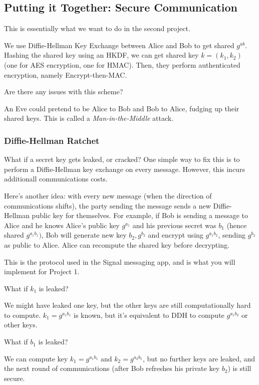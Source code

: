 \subsection{Putting it Together: Secure Communication}
This is essentially what we want to do in the second project.

We use Diffie-Hellman Key Exchange between Alice and Bob to get shared $g^{ab}$. Hashing the shared key using an HKDF, we can get shared key $k = (k_1, k_2)$ (one for AES encryption, one for HMAC). Then, they perform authenticated encryption, namely Encrypt-then-MAC.

\begin{ques*}
    Are there any issues with this scheme?
\end{ques*}
An Eve could pretend to be Alice to Bob and Bob to Alice, fudging up their shared keys. This is called a \emph{Man-in-the-Middle} attack.

\subsubsection{Diffie-Hellman Ratchet}
What if a secret key gets leaked, or cracked? One simple way to fix this is to perform a Diffie-Hellman key exchange on every message. However, this incurs additionall communications costs.

Here's another idea: with every new message (when the direction of communications shifts), the party sending the message sends a new Diffie-Hellman public key for themselves. For example, if Bob is sending a message to Alice and he knows Alice's public key $g^{a_1}$ and his previous secret was $b_1$ (hence shared $g^{a_1b_1})$, Bob will generate new key $b_2, g^{b_2}$ and encrypt using $g^{a_1b_2}$, sending $g^{b_2}$ as public to Alice. Alice can recompute the shared key before decrypting.


This is the protocol used in the Signal messaging app, and is what you will implement for Project 1.

\begin{ques*}
    What if $k_1$ is leaked?
\end{ques*}
We might have leaked one key, but the other keys are still computationally hard to compute. $k_1=g^{a_1b_1}$ is known, but it's equivalent to DDH to compute $g^{a_1b_2}$ or other keys.

\begin{ques*}
    What if $b_1$ is leaked?
\end{ques*}
We can compute key $k_1=g^{a_1b_1}$ and $k_2=g^{a_2b_1}$, but no further keys are leaked, and the next round of communications (after Bob refreshes his private key $b_2$) is still secure.

